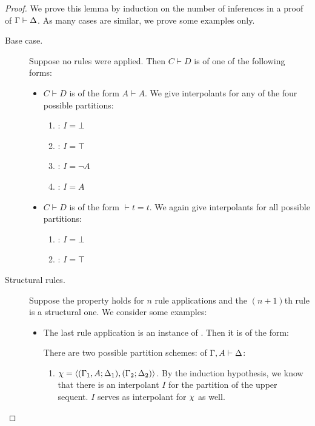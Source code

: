\begin{proof}
	We prove this lemma by induction on the number of inferences in a proof of $\Gamma \vdash \Delta$.
	As many cases are similar, we prove some examples only.
	\begin{description}
		\item[\normalfont Base case.]
			Suppose no rules were applied.
			Then $C \vdash D$ is of one of the following forms:
			\begin{itemize}
				\item $C \vdash D$ is of the form $A \vdash A$. We give interpolants for any of the four possible partitions:
					\begin{enumerate}
						\item {}: $I=\bot$
						\item {}: $I=\top$
						\item {}: $I=\lnot A$
						\item {}: $I=A$
					\end{enumerate}
				\item $C \vdash D$ is of the form $\vdash t=t$. We again give interpolants for all possible partitions:
					\begin{enumerate}
						\item {}: $I=\bot$
						\item {}: $I=\top$
					\end{enumerate}
			\end{itemize}

		\item[\normalfont Structural rules.]
			Suppose the property holds for $n$ rule applications and the $(n+1)$th rule is a structural one.
			We consider some examples:

			\begin{itemize}
				\item The last rule application is an instance of . Then it is of the form:
					\begin{prooftree}
					\end{prooftree}

					There are two possible partition schemes: of $\Gamma, A \vdash \Delta$:
					\begin{enumerate}
						\item $\chi =  \langle (\Gamma_1, A; \Delta_1), (\Gamma_2; \Delta_2)\rangle $.
							By the induction hypothesis, we know that there is an interpolant $I$ for the partition  of the upper sequent.
							$I$ serves as interpolant for $\chi$ as well.


\end{enumerate}
\end{itemize}
\end{description}
\end{proof}
